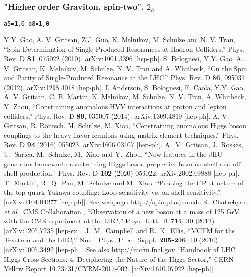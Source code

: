 \documentclass[aps,superscriptaddress,nofootinbib]{revtex4}
\begin{document}
\subsubsection{"Higher order Graviton, spin-two", \texorpdfstring{$2^-_h$}{2-h}}
\verb|a5=1,0 b8=1,0|
\begin{thebibliography}{99}
Y.Y. Gao, A. V. Gritsan, Z.J. Guo, K. Melnikov, M. Schulze and N. V. Tran, ``Spin-Determination of Single-Produced Resonances at Hadron Colliders.'' Phys. Rev. D \textbf{81}, 075022 (2010). arXiv:1001.3396 [hep-ph].
S. Bolognesi, Y.Y. Gao, A. V. Gritsan, K. Melnikov, M. Schulze, N. V. Tran and A. Whitbeck, ``On the Spin and Parity of Single-Produced Resonance at the LHC.'' Phys. Rev. D \textbf{86}, 095031 (2012). arXiv:1208.4018 [hep-ph].
I. Anderson, S. Bolognesi, F. Caola, Y.Y. Gao, A. V. Gritsan, C. B. Martin, K. Melnikov, M. Schulze, N. V. Tran, A. Whitbeck, Y. Zhou, ``Constraining anomalous HVV interactions at proton and lepton colliders.'' Phys. Rev. D \textbf{89}, 035007 (2014). arXiv:1309.4819 [hep-ph].
A. V. Gritsan, R. R\"ontsch, M. Schulze, M. Xiao, ``Constraining anomalous Higgs boson couplings to the heavy flavor fermions using matrix element techniques.'' Phys. Rev. D \textbf{94} (2016) 055023. arXiv:1606.03107 [hep-ph].
 A.~V.~Gritsan, J.~Roskes, U.~Sarica, M.~Schulze, M.~Xiao and Y.~Zhou, ``New features in the JHU generator framework: 
 constraining Higgs boson properties from on-shell and off-shell production.'' 
 Phys. Rev. D \textbf{102} (2020) 056022. arXiv:2002.09888 [hep-ph].
T.~Martini, R.~Q.~Pan, M.~Schulze and M.~Xiao,
``Probing the CP structure of the top quark Yukawa coupling: Loop sensitivity vs. on-shell sensitivity.''
[arXiv:2104.04277 [hep-ph]].
See webpage: \url{http://spin.pha.jhu.edu}
  S.~Chatrchyan {\it et al.}  [CMS Collaboration],
  ``Observation of a new boson at a mass of 125 GeV with the CMS experiment at the LHC,''
  Phys.\ Lett.\ B {\bf 716}, 30 (2012)
  [arXiv:1207.7235 [hep-ex]].
  J.~M.~Campbell and R.~K.~Ellis,
  ``MCFM for the Tevatron and the LHC,''
  Nucl.\ Phys.\ Proc.\ Suppl.\  {\bf 205-206}, 10 (2010)
  [arXiv:1007.3492 [hep-ph]].
  See also http://mcfm.fnal.gov
``Handbook of LHC Higgs Cross Sections: 4. Deciphering the Nature of the Higgs Sector,''
CERN Yellow Report 10.23731/CYRM-2017-002.
[arXiv:1610.07922 [hep-ph]].

\end{thebibliography}
\end{document}
